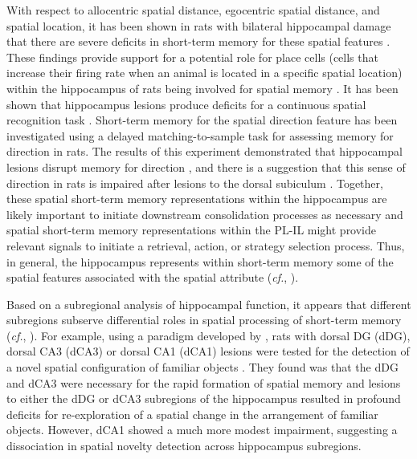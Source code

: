 \documentclass[doc, longtable]{apa6}
\begin{document}
With respect to allocentric spatial distance, egocentric spatial distance, and spatial location, it has been shown in rats with bilateral hippocampal damage that there are severe deficits in short-term memory for these spatial features \parencite{Long1996a}. These findings provide support for a potential role for place cells (cells that increase their firing rate when an animal is located in a specific spatial location) within the hippocampus of rats being involved for spatial memory \parencite{Kubie1983a, McNaughton1983a, OKeefe1987a, OKeefe1978a}. It has been shown that hippocampus lesions produce deficits for a continuous spatial recognition task \parencite{Jackson-Smith1993a}. Short-term memory for the spatial direction feature has been investigated using a delayed matching-to-sample task for assessing memory for direction in rats. The results of this experiment demonstrated that hippocampal lesions disrupt memory for direction \parencite{DeCoteau2004a}, and there is a suggestion that this sense of direction in rats is impaired after lesions to the dorsal subiculum \parencite{Potvin2007a}. Together, these spatial short-term memory representations within the hippocampus are likely important to initiate downstream consolidation processes as necessary and spatial short-term memory representations within the PL-IL might provide relevant signals to initiate a retrieval, action, or strategy selection process. Thus, in general, the hippocampus represents within short-term memory some of the spatial features associated with the spatial attribute (\textit{cf.}, \cite{Kesner2002,Kesner2013e}).

Based on a subregional analysis of hippocampal function, it appears that different subregions subserve differential roles in spatial processing of short-term memory (\textit{cf.}, \cite{Kesner2004b}). For example, using a paradigm developed by \textcite{Poucet1989a}, rats with dorsal DG (dDG), dorsal CA3 (dCA3) or dorsal CA1 (dCA1) lesions were tested for the detection of a novel spatial configuration of familiar objects \parencite{Lee2005b, Lee2005c}. They found was that the dDG and dCA3 were necessary for the rapid formation of spatial memory and lesions to either the dDG or dCA3 subregions of the hippocampus resulted in profound deficits for re-exploration of a spatial change in the arrangement of familiar objects. However, dCA1 showed a much more modest impairment, suggesting a dissociation in spatial novelty detection across hippocampus subregions. 
\end{document}
